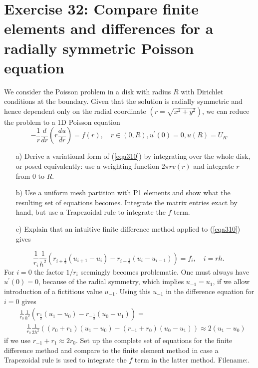 \documentclass[../main.tex]{subfiles}
\begin{document}
	\section*{Exercise 32: Compare finite elements and differences for a radially symmetric Poisson equation}
		\noindent We consider the Poisson problem in a disk with radius $R$ with Dirichlet conditions at the boundary. Given that the solution is radially symmetric and hence dependent only on the radial coordinate $\left(r=\sqrt{x^{2}+y^{2}}\right)$, we can reduce the problem to a 1D Poisson equation
		\begin{equation}
			\label{eqa310}
			-\frac{1}{r} \frac{d}{d r}\left(r \frac{d u}{d r}\right)=f(r), \quad r \in(0, R), u^{\prime}(0)=0, u(R)=U_{R} .
		\end{equation}
		\begin{enumerate}
			\item [a)] Derive a variational form of (\ref{eqa310}) by integrating over the whole disk, or posed equivalently: use a weighting function $2 \pi r v(r)$ and integrate $r$ from 0 to $R$.
			\item[b)] Use a uniform mesh partition with P1 elements and show what the resulting set of equations becomes. Integrate the matrix entries exact by hand, but use a Trapezoidal rule to integrate the $f$ term.
			\item[c)]Explain that an intuitive finite difference method applied to (\ref{eqa310}) gives
		\end{enumerate}
		$$
		\frac{1}{r_{i}} \frac{1}{h^{2}}\left(r_{i+\frac{1}{2}}\left(u_{i+1}-u_{i}\right)-r_{i-\frac{1}{2}}\left(u_{i}-u_{i-1}\right)\right)=f_{i}, \quad i=r h \text {. }
		$$\smallbreak
		For $i=0$ the factor $1 / r_{i}$ seemingly becomes problematic. One must always have $u^{\prime}(0)=0$, because of the radial symmetry, which implies $u_{-1}=u_{1}$, if we allow introduction of a fictitious value $u_{-1}$. Using this $u_{-1}$ in the difference equation for $i=0$ gives
		$$
		\begin{aligned}
			&\frac{1}{r_{0}} \frac{1}{h^{2}}\left(r_{\frac{1}{2}}\left(u_{1}-u_{0}\right)-r_{-\frac{1}{2}}\left(u_{0}-u_{1}\right)\right)= \\
			&\quad \frac{1}{r_{0}} \frac{1}{2 h^{2}}\left(\left(r_{0}+r_{1}\right)\left(u_{1}-u_{0}\right)-\left(r_{-1}+r_{0}\right)\left(u_{0}-u_{1}\right)\right) \approx 2\left(u_{1}-u_{0}\right)
		\end{aligned}
		$$
		if we use $r_{-1}+r_{1} \approx 2 r_{0}$.\smallbreak
		Set up the complete set of equations for the finite difference method and compare to the finite element method in case a Trapezoidal rule is used to integrate the $f$ term in the latter method.
		Filename:. \bigbreak
\end{document}
